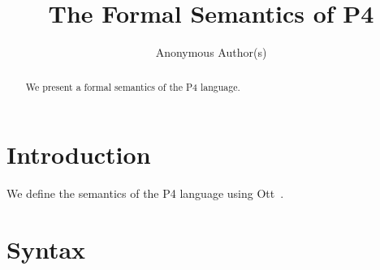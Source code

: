 \documentclass{easychair}
\title{The Formal Semantics of P4}
\author{Anonymous Author(s)}
\institute{}
\begin{document}
\maketitle

\begin{abstract}
We present a formal semantics of the P4 language.
\end{abstract}

\section{Introduction}

We define the semantics of the P4 language using Ott~\cite{Sewell2010}.

\section{Syntax}

\ottgrammar



\end{document}
